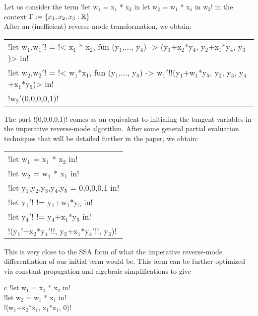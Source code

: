 \begin{example}[First-order term]
Let us consider the term !let w$_1$ = x$_1$ * x$_2$ in let w$_2$ = w$_1$ * x$_1$ in w$_2$! in the context $\Gamma:=\{x_1,x_2, x_3:\mathbb{R}\}$.\\
After an (inefficient) reverse-mode transformation, we obtain:
\begin{center}
    \begin{tabular}{l}
        !let w$_1$,w$_1'$! = !< x$_1$ * x$_2$, fun (y$_1$,$\ldots$, y$_4$) -> (y$_1$+x$_2$*y$_4$, y$_2$+x$_1$*y$_4$, y$_3$)> in!\\
        !let w$_2$,w$_2'$! = !< w$_1$*x$_1$, fun (y$_1$,$\ldots$, y$_5$) -> w$_1'$!!(y$_1$+w$_1$*y$_5$, y$_2$, y$_3$, y$_4$+x$_1$*y$_5$)> in!\\
        !w$_2'$(0,0,0,0,1)!
    \end{tabular}
\end{center}
The part !(0,0,0,0,1)! comes as an equivalent to initialing the tangent variables in the imperative reverse-mode algorithm. 
After some general partial evaluation techniques that will be detailed further in the paper, we obtain:    

    \begin{center}
            \begin{tabular}{l}
                !let w$_1$ = x$_1$ * x$_2$ in!\\ 
                !let w$_2$ = w$_1$ * x$_1$ in!\\
                !let y$_1$,y$_2$,y$_3$,y$_4$,y$_5$ = 0,0,0,0,1 in!\\
                !let y$_1'$! != y$_1$+w$_1$*y$_5$ in!\\
                !let y$_4'$! != y$_4$+x$_1$*y$_5$ in!\\
                !(y$_1'$+x$_2$*y$_4'$!!, y$_2$+x$_1$*y$_4'$!!, y$_3$)!
            \end{tabular}
    \end{center}   
This is very close to the SSA form \cite{cytron1989efficient} of what the imperative reverse-mode differentiation of our initial term would be.
This term can be further optimized via constant propagation and algebraic simplifications to give
        \begin{center}
            \begin{tabular}{{c}}
                !let w$_1$ = x$_1$ * x$_2$ in!\\ 
                !let w$_2$ = w$_1$ * x$_1$ in!\\
                !(w$_1$+x$_2$*x$_1$, x$_1$*x$_1$, 0)!
            \end{tabular}
        \end{center}
    \end{example}

